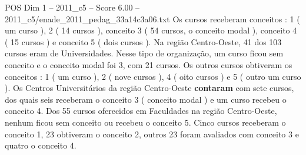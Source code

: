 \begin{textsample}{POS Dim 1 – 2011\_c5 – Score 6.00 – 2011\_c5/enade\_2011\_pedag\_33a14c3a06.txt}
Os cursos receberam conceitos : 1 ( um curso ), 2 ( 14 cursos ), conceito 3 ( 54 cursos, o conceito modal ), conceito 4 ( 15 cursos ) e conceito 5 ( dois cursos ).
Na região Centro-Oeste, 41 dos 103 cursos eram de Universidades.
Nesse tipo de organização, um curso ficou sem conceito e o conceito modal foi 3, com 21 cursos.
Os outros cursos obtiveram os conceitos : 1 ( um curso ), 2 ( nove cursos ), 4 ( oito cursos ) e 5 ( outro um curso ).
Os Centros Universitários da região Centro-Oeste \textbf{contaram} com sete cursos, dos quais seis receberam o conceito 3 ( conceito modal ) e um curso recebeu o conceito 4.
Dos 55 cursos oferecidos em Faculdades na região Centro-Oeste, nenhum ficou sem conceito ou recebeu o conceito 5.
Cinco cursos receberam o conceito 1, 23 obtiveram o conceito 2, outros 23 foram avaliados com conceito 3 e quatro o conceito 4.

\end{textsample}
